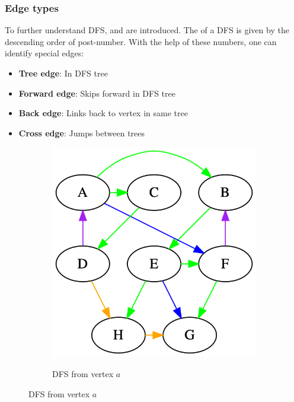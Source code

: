 \documentclass[a3paper, landscape, 11pt]{article} %
\begin{document}
\begin{multicols*}{4}
\subsubsection*{Edge types}

To further understand DFS,  and  are introduced. The  of a DFS is given by the descending order of post-number. With the help of these numbers, one can identify special edges:
\begin{itemize}[noitemsep]
	\item \colorbox{green!30}{\textbf{Tree edge}}: In DFS tree
	\item \colorbox{blue!30}{\textbf{Forward edge}}: Skips forward in DFS tree
	\item \colorbox{violet!30}{\textbf{Back edge}}: Links back to vertex in same tree
	\item \colorbox{orange!30}{\textbf{Cross edge}}: Jumps between trees
\end{itemize}

\begin{figure}[H]
\centering
  \begin{subfigure}[b]{0.45\columnwidth}
    \centering
    \includegraphics[width=1\textwidth]{images/edge-types.png}
    \label{fig:image4}
    \caption{DFS from vertex $a$}
  \end{subfigure}
\end{figure}
\vfill %


\end{multicols*}
\end{document}
